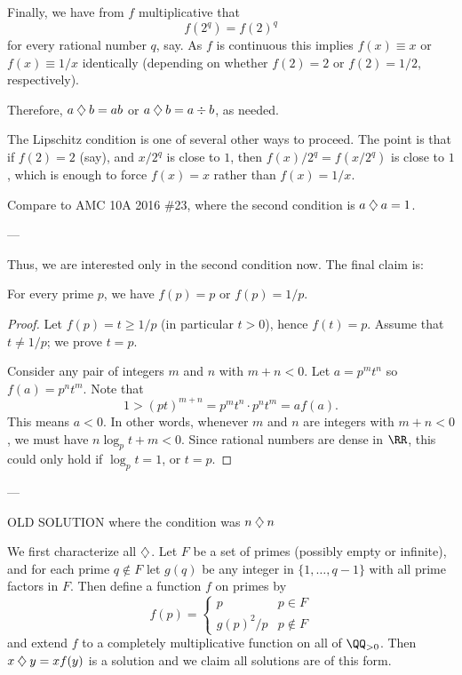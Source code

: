 Finally, we have from $f$ multiplicative that
\[ f(2^q) = f(2)^q \]
for every rational number $q$, say.
As $f$ is continuous this implies $f(x) \equiv x$ or $f(x) \equiv 1/x$ identically
(depending on whether $f(2) = 2$ or $f(2)=1/2$, respectively).

Therefore, $a \mathbin{\diamondsuit} b = ab$ or $a \mathbin{\diamondsuit} b = a \div b$, as needed.

\begin{remark*}
  The Lipschitz condition is one of several other ways to proceed.
  The point is that if $f(2) = 2$ (say),
  and $x/2^q$ is close to $1$,
  then $f(x)/2^q = f(x/2^q)$ is close to $1$,
  which is enough to force $f(x) = x$ rather than $f(x) = 1/x$.
\end{remark*}

\begin{remark*}
  Compare to AMC 10A 2016 \#23,
  where the second condition is $a \mathbin{\diamondsuit} a = 1$.
\end{remark*}


---

Thus, we are interested only in the second condition now.
The final claim is:

\begin{claim*}
  For every prime $p$, we have $f(p) = p$ or $f(p) = 1/p$.
\end{claim*}
\begin{proof}
  Let $f(p) = t \ge 1/p$ (in particular $t>0$), hence $f(t) = p$.
  Assume that $t \neq 1/p$; we prove $t = p$.

  Consider any pair of integers $m$ and $n$ with $m+n < 0$.
  Let $a = p^m t^n$ so $f(a) = p^n t^m$.
  Note that
  \[ 1 > (pt)^{m+n} = p^m t^n \cdot p^n t^m = a f(a). \]
  This means $a < 0$. In other words,
  whenever $m$ and $n$ are integers with $m+n< 0$,
  we must have $n \log_p t + m < 0$.
  Since rational numbers are dense in $\RR$,
  this could only hold if $\log_p t = 1$, or $t = p$.
\end{proof}
---


\pagebreak
OLD SOLUTION where the condition was $n \mathbin{\diamondsuit} n$

We first characterize all $\mathbin{\diamondsuit}$.
Let $F$ be a set of primes (possibly empty or infinite),
and for each prime $q \notin F$ let $g(q)$
be any integer in $\{1, \dots, q-1\}$ with all prime factors in $F$.
Then define a function $f$ on primes by
\[
  f(p) = \begin{cases}
    p & p \in F \\
    g(p)^2/p & p \notin F
  \end{cases}
\]
and extend $f$ to a completely multiplicative function on all of $\QQ_{>0}$.
Then $x \mathbin{\diamondsuit} y = x f(y)$ is a solution and we claim all solutions
are of this form.

